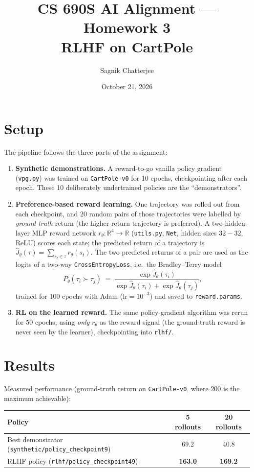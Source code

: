 \documentclass[11pt]{article}
\title{CS 690S AI Alignment --- Homework 3\\ \large RLHF on CartPole}
\author{Sagnik Chatterjee}
\date{October 21, 2026}
\begin{document}
\maketitle

\section{Setup}

The pipeline follows the three parts of the assignment:

\begin{enumerate}
  \item \textbf{Synthetic demonstrations.} A reward-to-go vanilla policy gradient
  (\texttt{vpg.py}) was trained on \texttt{CartPole-v0} for 10 epochs, checkpointing after
  each epoch. These 10 deliberately undertrained policies are the ``demonstrators''.
  \item \textbf{Preference-based reward learning.} One trajectory was rolled out from each
  checkpoint, and 20 random pairs of those trajectories were labelled by \emph{ground-truth}
  return (the higher-return trajectory is preferred). A two-hidden-layer MLP reward network
  $r_\theta : \mathbb{R}^4 \to \mathbb{R}$ (\texttt{utils.py}, \texttt{Net}, hidden sizes
  $32{-}32$, ReLU) scores each state; the predicted return of a trajectory is
  $\hat{J}_\theta(\tau) = \sum_{s_t \in \tau} r_\theta(s_t)$. The two predicted returns of a
  pair are used as the logits of a two-way \texttt{CrossEntropyLoss}, i.e.\ the
  Bradley--Terry model
  \[
    P_\theta(\tau_i \succ \tau_j) \;=\; \frac{\exp \hat{J}_\theta(\tau_i)}
    {\exp \hat{J}_\theta(\tau_i) + \exp \hat{J}_\theta(\tau_j)},
  \]
  trained for 100 epochs with Adam ($\text{lr}=10^{-3}$) and saved to \texttt{reward.params}.
  \item \textbf{RL on the learned reward.} The same policy-gradient algorithm was rerun for 50
  epochs, using \emph{only} $r_\theta$ as the reward signal (the ground-truth reward is never
  seen by the learner), checkpointing into \texttt{rlhf/}.
\end{enumerate}

\section{Results}

Measured performance (ground-truth return on \texttt{CartPole-v0}, where 200 is the maximum
achievable):

\begin{center}
\begin{tabular}{lcc}
\toprule
Policy & 5 rollouts & 20 rollouts \\
\midrule
Best demonstrator (\texttt{synthetic/policy\_checkpoint9}) & 69.2 & 40.8 \\
RLHF policy (\texttt{rlhf/policy\_checkpoint49}) & \textbf{163.0} & \textbf{169.2} \\
\bottomrule
\end{tabular}
\end{center}
\end{document}
